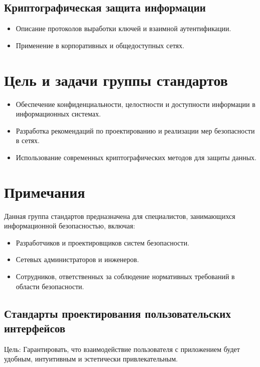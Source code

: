\subsection*{Криптографическая защита информации}
\begin{itemize}
    \item Описание протоколов выработки ключей и взаимной аутентификации.
    \item Применение в корпоративных и общедоступных сетях.
\end{itemize}

\section*{Цель и задачи группы стандартов}
\begin{itemize}
    \item Обеспечение конфиденциальности, целостности и доступности информации в информационных системах.
    \item Разработка рекомендаций по проектированию и реализации мер безопасности в сетях.
    \item Использование современных криптографических методов для защиты данных.
\end{itemize}

\section*{Примечания}
Данная группа стандартов предназначена для специалистов, занимающихся информационной безопасностью, включая:
\begin{itemize}
    \item Разработчиков и проектировщиков систем безопасности.
    \item Сетевых администраторов и инженеров.
    \item Сотрудников, ответственных за соблюдение нормативных требований в области безопасности.
\end{itemize}

\subsection{Стандарты проектирования пользовательских интерфейсов}

Цель: Гарантировать, что взаимодействие пользователя с приложением будет удобным, интуитивным и эстетически привлекательным.
